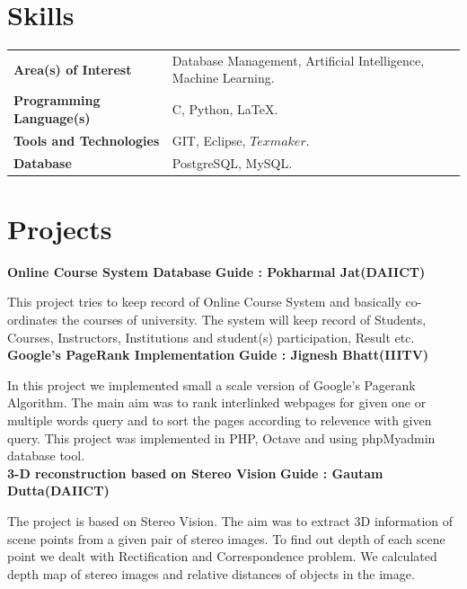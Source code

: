 \documentclass{article}
\begin{document}
\vspace*{.4cm}
\section{Skills}
\begin{tabular}{ll}
\textbf{Area(s) of Interest} &Database Management, Artificial Intelligence, Machine Learning.\\
\textbf{Programming Language(s)}&C, Python, \LaTeX.\\
\textbf{Tools and Technologies} & GIT, Eclipse, $Texmaker$. \\
\textbf{Database} & PostgreSQL, MySQL.\\
\end{tabular}

\vspace*{.5cm}
\section{Projects}
\textbf{\large{Online Course System Database}} \hspace*{6cm} \textbf{Guide : Pokharmal Jat(DAIICT)}

\vspace*{.051mm}
\hspace*{2.6mm} This project tries to keep record of Online Course System and basically co-ordinates the courses of university. The system will keep record of Students, Courses, Instructors, Institutions and student(s) participation, Result etc.\\

\textbf{\large{Google's PageRank Implementation}} \hspace*{6cm} \textbf{Guide : Jignesh Bhatt(IIITV)}

\vspace*{.051mm}
\hspace*{2.6mm} In this project we implemented small a scale version of Google's Pagerank Algorithm. The main aim was to rank interlinked webpages for given one or multiple words query and to sort the pages according to relevence with given query. This project was implemented in PHP, Octave and using phpMyadmin database tool.\\

\textbf{\large{3-D reconstruction based on Stereo Vision}} \hspace*{3.6cm} \textbf{Guide : Gautam Dutta(DAIICT)}

\vspace*{.051mm}
\hspace*{2.6mm} The project is based on Stereo Vision. The aim was to extract 3D information of scene points from a given pair of stereo images. To find out depth of each scene point we dealt with Rectification and Correspondence problem. We calculated depth map of stereo images and relative distances of objects in the image.
\end{document}
